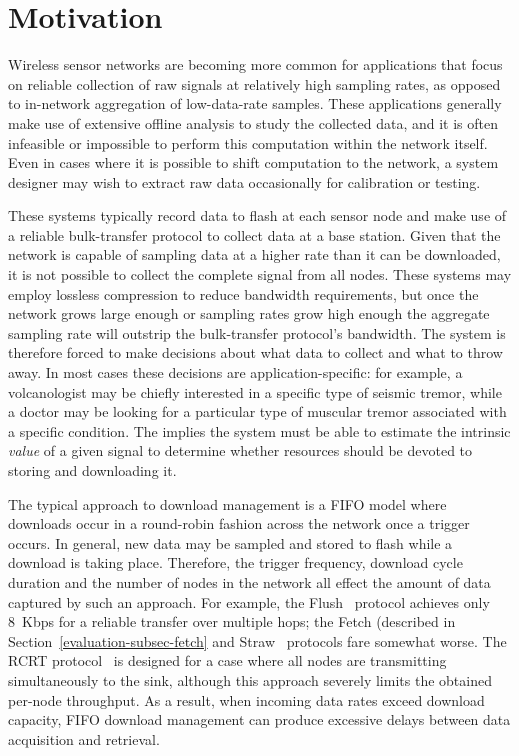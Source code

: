 \section{Motivation}
\label{lance-sec-motivation}

Wireless sensor networks are becoming more common for applications that focus
on reliable collection of raw signals at relatively high sampling rates, as
opposed to in-network aggregation of low-data-rate samples. These
applications generally make use of extensive offline analysis to study the
collected data, and it is often infeasible or impossible to perform this
computation within the network itself. Even in cases where it is possible to
shift computation to the network, a system designer may wish to extract raw
data occasionally for calibration or testing.

These systems typically record data to flash at each sensor node and make use
of a reliable bulk-transfer protocol to collect data at a base station. Given
that the network is capable of sampling data at a higher rate than it can be
downloaded, it is not possible to collect the complete signal from all nodes.
These systems may employ lossless compression to reduce bandwidth
requirements, but once the network grows large enough or sampling rates grow
high enough the aggregate sampling rate will outstrip the bulk-transfer
protocol's bandwidth. The system is therefore forced to make decisions about
what data to collect and what to throw away. In most cases these decisions
are application-specific: for example, a volcanologist may be chiefly
interested in a specific type of seismic tremor, while a doctor may be
looking for a particular type of muscular tremor associated with a specific
condition. The implies the system must be able to estimate the intrinsic
\textit{value} of a given signal to determine whether resources should be
devoted to storing and downloading it.

The typical approach to download management is a FIFO model where downloads
occur in a round-robin fashion across the network once a trigger occurs. In
general, new data may be sampled and stored to flash while a download is
taking place. Therefore, the trigger frequency, download cycle duration and
the number of nodes in the network all effect the amount of data captured by
such an approach. For example, the Flush~\cite{flush-sensys07} protocol
achieves only 8~Kbps for a reliable transfer over multiple hops; the Fetch
(described in Section~\ref{evaluation-subsec-fetch} and
Straw~\cite{ggb-ipsn07} protocols fare somewhat worse. The RCRT
protocol~\cite{rcrt-sensys07} is designed for a case where all nodes are
transmitting simultaneously to the sink, although this approach severely
limits the obtained per-node throughput. As a result, when incoming data
rates exceed download capacity, FIFO download management can produce
excessive delays between data acquisition and retrieval.

